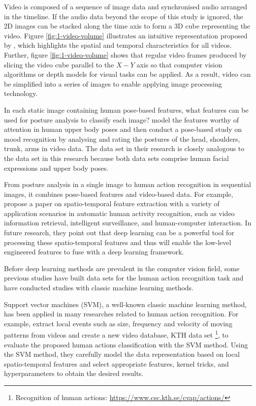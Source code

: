 Video is composed of a sequence of image data and synchronised audio arranged in the timeline. 
If the audio data beyond the scope of this study is ignored, the 2D images can be stacked along the time axis to form a 3D cube representing the video. Figure \ref{fig:1-video-volume} illustrates an intuitive representation proposed by \citet{fels1999interactive}, which highlights the spatial and temporal characteristics for all videos.
Further, figure \ref{fig:1-video-volume} shows that regular video frames produced by slicing the video cube parallel to the $X-Y$ axis so that computer vision algorithms or depth models for visual tasks can be applied.
As a result, video can be simplified into a series of images to enable applying image processing technology.

In each static image containing human pose-based features, what features can be used for posture analysis to classify each image? 
\citet{thrasher2011mood} model the features worthy of attention in human upper body poses and then conduct a pose-based study on mood recognition by analysing and rating the postures of the head, shoulders, trunk, arms in video data.
The data set in their research is closely analogous to the data set in this research because both data sets comprise human facial expressions and upper body poses.

From posture analysis in a single image to human action recognition in sequential images, it combines pose-based features and video-based data.
For example, \citet{yao2016spatio} propose a paper on spatio-temporal feature extraction with a variety of application scenarios in automatic human activity recognition, such as video information retrieval, intelligent surveillance, and human-computer interaction.
In future research, they point out that deep learning can be a powerful tool for processing these spatio-temporal features and thus will enable the low-level engineered features to fuse with a deep learning framework.

Before deep learning methods are prevalent in the computer vision field, some previous studies have built data sets for the human action recognition task and have conducted studies with classic machine learning methods.

Support vector machines (SVM), a well-known classic machine learning method, has been applied in many researches related to human action recognition.
For example, \citet{schuldt2004recognizing} extract local events such as size, frequency and velocity of moving patterns from videos and create a new video database, KTH data set \footnote{Recognition of human actions: \url{https://www.csc.kth.se/cvap/actions/}}, to evaluate the proposed human actions classification with the SVM method.
Using the SVM method, they carefully model the data representation based on local spatio-temporal features and select appropriate features, kernel tricks, and hyperparameters to obtain the desired results.

